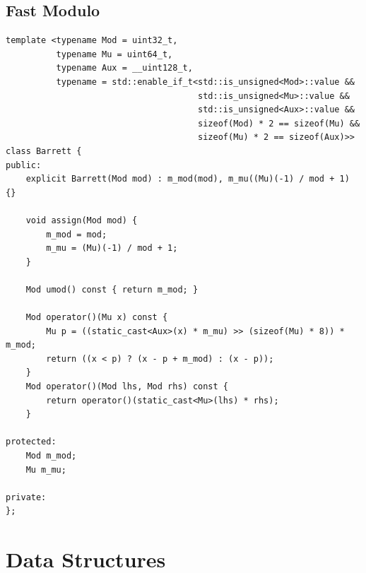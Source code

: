 \documentclass[UTF8]{article}
\begin{document}
\subsection{Fast Modulo}
\begin{verbatim}
template <typename Mod = uint32_t,
		  typename Mu = uint64_t,
		  typename Aux = __uint128_t,
		  typename = std::enable_if_t<std::is_unsigned<Mod>::value &&
									  std::is_unsigned<Mu>::value &&
									  std::is_unsigned<Aux>::value &&
									  sizeof(Mod) * 2 == sizeof(Mu) &&
									  sizeof(Mu) * 2 == sizeof(Aux)>>
class Barrett {
public:
	explicit Barrett(Mod mod) : m_mod(mod), m_mu((Mu)(-1) / mod + 1) {}

	void assign(Mod mod) {
		m_mod = mod;
		m_mu = (Mu)(-1) / mod + 1;
	}

	Mod umod() const { return m_mod; }

	Mod operator()(Mu x) const {
		Mu p = ((static_cast<Aux>(x) * m_mu) >> (sizeof(Mu) * 8)) * m_mod;
		return ((x < p) ? (x - p + m_mod) : (x - p));
	}
	Mod operator()(Mod lhs, Mod rhs) const {
		return operator()(static_cast<Mu>(lhs) * rhs);
	}

protected:
	Mod m_mod;
	Mu m_mu;

private:
};
\end{verbatim}

\section{Data Structures}
\end{document}
